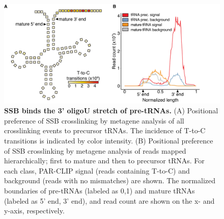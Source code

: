 \documentclass[12pt]{rockefeller}
\begin{document}
\begin{figure}[!h]%
\centering
\includegraphics[width=\textwidth]{paper2ef.png}%
\caption[SSB binds the 3' oligoU stretch of pre-tRNAs.]
{
\textbf{SSB binds the 3' oligoU stretch of pre-tRNAs.}
(A) Positional preference of SSB crosslinking by metagene analysis of all crosslinking events to precursor tRNAs. The incidence of T-to-C transitions is indicated by color intensity. (B) Positional preference of SSB crosslinking by metagene analysis of reads mapped hierarchically; first to mature and then to precursor tRNAs. For each class, PAR-CLIP signal (reads containing T-to-C) and background (reads with no mismatches) are shown. The normalized boundaries of pre-tRNAs (labeled as 0,1) and mature tRNAs (labeled as 5’ end, 3’ end), and read count are shown on the x- and y-axis, respectively.
}
\centering
\label{paper2ef}%
\end{figure}
\end{document}
